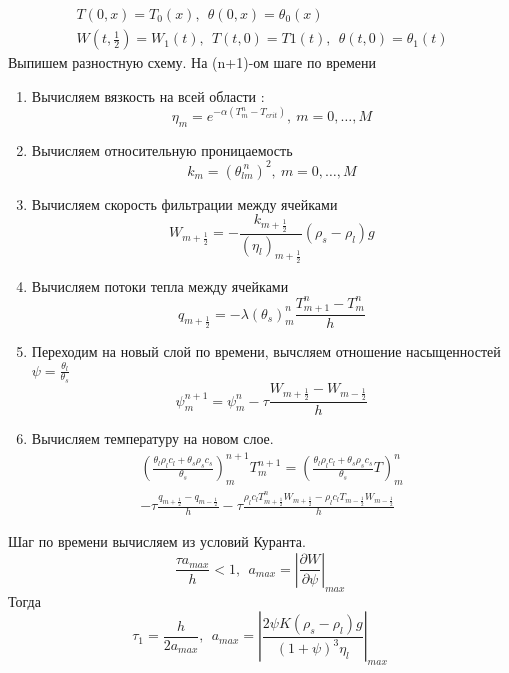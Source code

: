 \documentclass[12pt]{article}
\newcommand{\pd}[2]{\frac{\partial #1}{\partial #2}}
\begin{document}
$$
\begin{aligned}
&T(0,x) = T_0(x), \ \ \theta(0, x) = \theta_0(x) \ \ \\
&W\left(t, \frac12\right)  = W_1(t),\ \ T(t, 0) = T1(t), \ \ \theta(t, 0) = \theta_1(t) \ \ 
\end{aligned}
$$ 
\newpage
Выпишем разностную схему. На (n+1)-ом шаге по времени 
\begin{enumerate}
\item Вычисляем вязкость на всей области : 
$$
\eta_m = e^{-\alpha(T_m^n - T_{crit})},\ m = 0, \dots ,M
$$
\item Вычисляем относительную проницаемость
$$
k_m = (\theta_{lm}^{\ n})^2 , \ m = 0,  \dots ,M
$$
\item Вычисляем скорость фильтрации между ячейками 
$$
W_{m+\frac12} = -\frac{k_{m+\frac12}}{(\eta_{l})_{m+\frac12}}(\rho_s - \rho_l)g
$$
\item Вычисляем потоки тепла между ячейками
$$
q_{m+\frac12} = - \lambda (\theta_{s})_m^{n} \frac{T_{m+1}^n - T_m^n}{h} 
$$
\item Переходим на новый слой по времени, вычсляем отношение насыщенностей $\psi = \frac {\theta_l}{\theta_s}$
$$
\psi_m^{n+1} = \psi_m^n - \tau \frac{W_{m+\frac12} - W_{m-\frac12}}{h}
$$
\item Вычисляем температуру на новом слое. 
\begin{multline}
\left(\frac{\theta_l \rho_l c_l + \theta_s \rho_s c_s}{\theta_s}\right)_m^{n+1} T_m^{n+1} =  \left(\frac{\theta_l \rho_l c_l + \theta_s \rho_s c_s}{\theta_s} T\right)_m^n \\
- \tau\frac{q_{m+\frac12} - q_{m-\frac12}}{h} - \tau\frac{\rho_l c_l T_{m+\frac12}^n W_{m+\frac12} - \rho_l c_l T_{m-\frac12} W_{m-\frac12}}{h}
\end{multline}
\end{enumerate}

Шаг по времени вычисляем из условий Куранта. 
$$
\frac{\tau a_{max}}{h} < 1,\ \ a_{max} = \left|\pd{W}{\psi}\right|_{max}
$$
Тогда
$$
\tau_1 = \frac{h}{2 a_{max}},\ \  a_{max} = \left|\frac{2 \psi K(\rho_s - \rho_l)g}{(1+\psi)^3 \eta_l}\right|_{max}
$$
\end{document}
